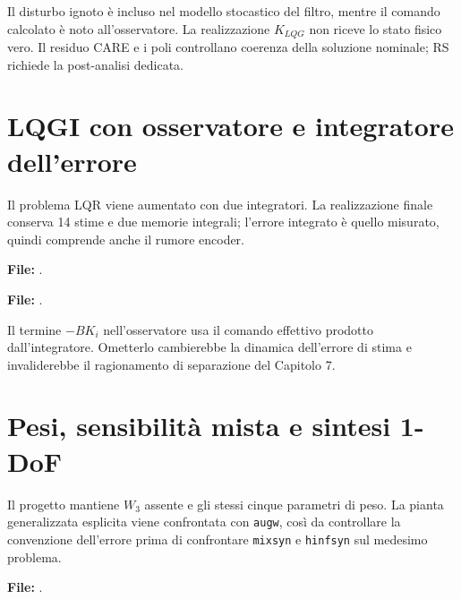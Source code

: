 Il disturbo ignoto è incluso nel modello stocastico del filtro, mentre
il comando calcolato è noto all'osservatore. La realizzazione $K_{LQG}$
non riceve lo stato fisico vero. Il residuo CARE e i poli controllano
coerenza della soluzione nominale; RS richiede la post-analisi dedicata.

\section{LQGI con osservatore e integratore dell'errore}
Il problema LQR viene aumentato con due integratori. La realizzazione
finale conserva 14 stime e due memorie integrali; l'errore integrato è
quello misurato, quindi comprende anche il rumore encoder.

\par\medskip\noindent\begin{minipage}{\linewidth}
\noindent\textbf{File:} .

\end{minipage}\par\medskip

\par\medskip\noindent\begin{minipage}{\linewidth}
\noindent\textbf{File:} .

\end{minipage}\par\medskip

Il termine $-BK_i$ nell'osservatore usa il comando effettivo prodotto
dall'integratore. Ometterlo cambierebbe la dinamica dell'errore di stima
e invaliderebbe il ragionamento di separazione del Capitolo 7.

\section{Pesi, sensibilità mista e sintesi 1-DoF}
Il progetto mantiene $W_3$ assente e gli stessi cinque parametri di
peso. La pianta generalizzata esplicita viene confrontata con
\texttt{augw}, così da controllare la convenzione dell'errore prima di
confrontare \texttt{mixsyn} e \texttt{hinfsyn} sul medesimo problema.

\par\medskip\noindent\begin{minipage}{\linewidth}
\noindent\textbf{File:} .

\end{minipage}\par\medskip

